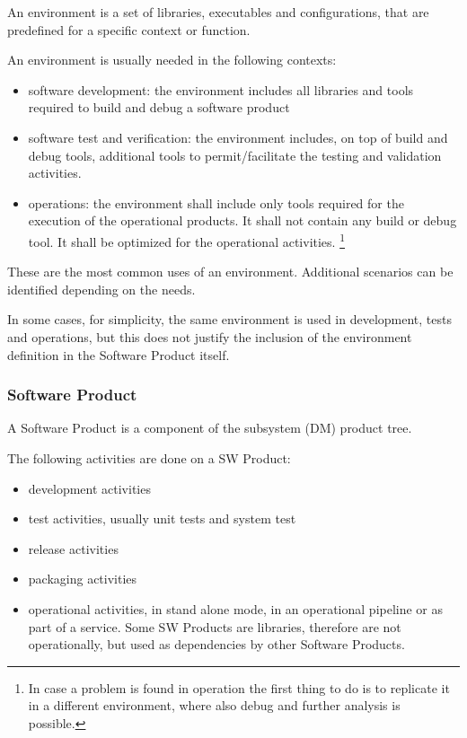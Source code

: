An environment is a set of libraries, executables and configurations, that are predefined for a specific context or function.

An environment is usually needed in the following contexts:

\begin{itemize}
\item software development: the environment includes all libraries and tools required to build and debug a software product
\item software test and verification: the environment includes, on top of build and debug tools, additional tools to permit/facilitate the testing and validation activities.
\item operations: the environment shall include only tools required for the execution of the operational products. It shall not contain any build or debug tool. It shall be optimized for the operational activities. \footnote{In case a problem is found in operation the first thing to do is to replicate it in a different environment, where also debug and further analysis is possible.}
\end{itemize}

These are the most common uses of an environment. Additional scenarios can be identified depending on the needs.

In some cases, for simplicity, the same environment is used in development, tests and operations, but this does not justify the inclusion of the environment definition in the Software Product itself.


\subsubsection{Software Product} \label{sec:swdef}

A Software Product is a component of the subsystem (DM) product tree.

The following activities are done on a SW Product:
\begin{itemize}
\item development activities
\item test activities, usually unit tests and system test
\item release activities
\item packaging activities
\item operational activities, in stand alone mode, in an operational pipeline or as part of a service. Some SW Products are libraries, therefore are not operationally, but used as dependencies by other Software Products.
\end{itemize}

